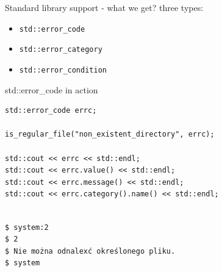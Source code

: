 \documentclass[10pt]{beamer}
\begin{document}
\begin{frame}{Standard library support - what we get?}
	three types:
	\begin{itemize}
		\item \texttt{std::error\_code}
		\item \texttt{std::error\_category}
		\item \texttt{std::error\_condition}
	\end{itemize}
\end{frame}

\begin{frame}[fragile]{std::error\_code in action}
	\begin{verbatim}
std::error_code errc;

is_regular_file("non_existent_directory", errc);

std::cout << errc << std::endl;
std::cout << errc.value() << std::endl;
std::cout << errc.message() << std::endl;
std::cout << errc.category().name() << std::endl;
	\end{verbatim}
	
	\hrulefill
	
	\texttt{\\
		\$ system:2 \\
		\$ 2 \\
		\$ Nie można odnalexć określonego pliku. \\
		\$ system}
\end{frame}
\end{document}
